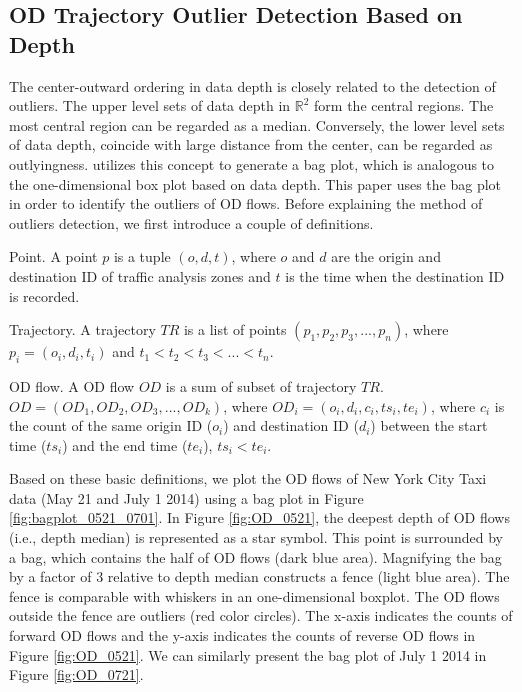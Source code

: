 \documentclass[a4paper,UKenglish]{lipics-v2016}
\begin{document}
\subsection{OD Trajectory Outlier Detection Based on Depth}
The center-outward ordering in data depth is closely related to the detection of outliers. The upper level sets of data depth in $\mathbb{R}^2$ form the central regions. The most central region can be regarded as a median. Conversely, the lower level sets of data depth, coincide with large distance from the center, can be regarded as outlyingness. \cite{rousseeuw99AS,aplpackR} utilizes this concept to generate a bag plot, which is analogous to the one-dimensional box plot based on data depth. This paper uses the bag plot in order to identify the outliers of OD flows. Before explaining the method of outliers detection, we first introduce a couple of definitions.

\begin{definition}{Point.}
	A point $p$ is a tuple $(o,d,t)$, where $o$ and $d$  are the origin and destination ID of  traffic analysis zones and $t$ is the time when the destination ID is recorded.
\end{definition}


\begin{definition}{Trajectory.}
	A trajectory $TR$ is a list of points $(p_1, p_2, p_3,...,p_n)$, where $p_i = (o_i,d_i,t_i)$ and $t_1<t_2<t_3<...<t_n$.
\end{definition}

\begin{definition}{OD flow.}
	A OD flow $OD$ is a sum of subset of trajectory $TR$. $OD = (OD_1, OD_2, OD_3,...,OD_k)$, where $OD_i = (o_i,d_i,c_i,ts_i, te_i)$, where $c_i$ is the count of the same origin ID ($o_i$) and destination ID ($d_i$) between the start time ($ts_i$) and the end time ($te_i$), $ts_i<te_i$.
\end{definition}

Based on these basic definitions, we plot the OD flows of New York City Taxi data (May 21 and July 1 2014) using a bag plot in Figure \ref{fig:bagplot_0521_0701}. In Figure \ref{fig:OD_0521}, the deepest depth of OD flows (i.e., depth median) is represented as a star symbol. This point is surrounded by a bag, which contains the half of OD flows (dark blue area). Magnifying the bag by a factor of 3 relative to depth median constructs a fence (light blue area). The fence is comparable with whiskers in an one-dimensional boxplot. The OD flows outside the fence are outliers (red color circles). The x-axis indicates the counts of forward OD flows and the y-axis indicates  the counts of reverse OD flows in Figure \ref{fig:OD_0521}. We can similarly present the bag plot of July 1 2014 in Figure \ref{fig:OD_0721}.
\end{document}
